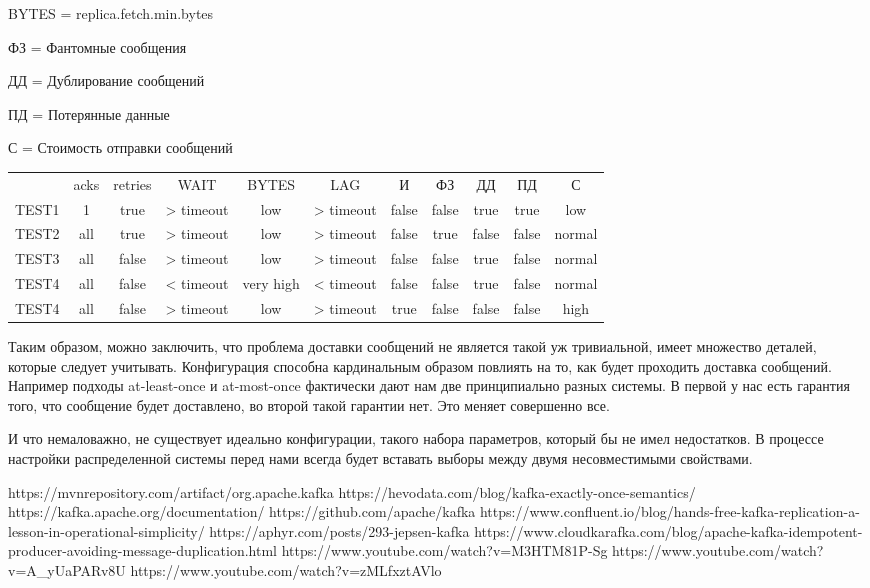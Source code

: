 \documentclass[11pt]{article}
\begin{document}
        BYTES = replica.fetch.min.bytes

        ФЗ = Фантомные сообщения

        ДД = Дублирование сообщений

        ПД = Потерянные данные

        С = Стоимость отправки сообщений

    \begin{center}
        \begin{tabular}{ c c c c c c c c c c c }
                  & acks & retries & WAIT & BYTES & LAG & И &
                  ФЗ & ДД & ПД & С  \\
                  TEST1 & 1 & true & > timeout & low & > timeout & false & false & true & true & low \\
                  TEST2 & all & true & > timeout & low & > timeout & false  & true & false & false & normal \\
                  TEST3 & all & false & > timeout & low & > timeout  & false & false & true & false & normal \\
                  TEST4 & all & false & < timeout & very high & < timeout & false  & false & true & false & normal \\
                  TEST4 & all & false & > timeout & low & > timeout & true  & false & false & false & high \\
        \end{tabular}
    \end{center}

    Таким образом, можно заключить, что проблема доставки сообщений не является такой уж тривиальной, имеет множество
    деталей, которые следует учитывать. Конфигурация способна кардинальным образом повлиять на то, как будет
    проходить доставка сообщений. Например подходы at-least-once и at-most-once фактически дают нам две принципиально
    разных системы. В первой у нас есть гарантия того, что сообщение будет доставлено, во второй такой гарантии нет.
    Это меняет совершенно все.

    И что немаловажно, не существует идеально конфигурации, такого набора параметров, который бы не имел недостатков.
    В процессе настройки распределенной системы перед нами всегда будет вставать выборы между двумя несовместимыми
    свойствами.
    \begin{thebibliography}{name}
         https://mvnrepository.com/artifact/org.apache.kafka
         https://hevodata.com/blog/kafka-exactly-once-semantics/
         https://kafka.apache.org/documentation/
         https://github.com/apache/kafka
         https://www.confluent.io/blog/hands-free-kafka-replication-a-lesson-in-operational-simplicity/
         https://aphyr.com/posts/293-jepsen-kafka
         https://www.cloudkarafka.com/blog/apache-kafka-idempotent-producer-avoiding-message-duplication.html
         https://www.youtube.com/watch?v=M3HTM81P-Sg
         https://www.youtube.com/watch?v=A\_yUaPARv8U
         https://www.youtube.com/watch?v=zMLfxztAVlo
    \end{thebibliography}
\end{document}
